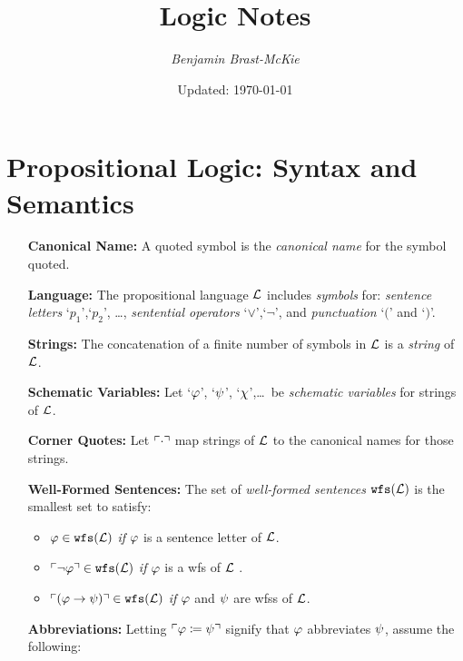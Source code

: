 \documentclass[a4paper, 11pt]{article} %
\title{\textbf{Logic Notes}} %
\author{\em Benjamin Brast-McKie} %
\date{Updated: \today} %
\makeatletter
\renewcommand{\maketitle}{ %
\begin{flushright} %
{\@date\hfill \LARGE\@title} %

\vspace{5pt} %

{\@author} %

\end{flushright}
}
\makeatother
\begin{document}
\maketitle %
\thispagestyle{empty}



\section*{\sc Propositional Logic: Syntax and Semantics}

\begin{enumerate}[leftmargin=1.2in] %
	\item[\bf Canonical Name:] A quoted symbol is the \textit{canonical name} for the symbol quoted.
	\item[\bf Language:] The propositional language $\mathcal{L}$ includes \textit{symbols} for: \textit{sentence letters} `$p_1$',`$p_2$', \dots, \textit{sentential operators} `$\vee$',`$\neg$', and \textit{punctuation} `$($' and `$)$'.
	\item[\bf Strings:] The concatenation of a finite number of symbols in $\mathcal{L}$ is a \textit{string} of $\mathcal{L}$.
	\item[\bf Schematic Variables:] Let `$\varphi$', `$\psi$', `$\chi$',\ldots\ be \textit{schematic variables} for strings of $\mathcal{L}$.
	\item[\bf Corner Quotes:] Let $\ulcorner\cdot\urcorner$ map strings of $\mathcal{L}$ to the canonical names for those strings.
	\item[\bf Well-Formed Sentences:] The set of \textit{well-formed sentences} $\texttt{wfs}(\mathcal{L})$ is the smallest set to satisfy:
	      \begin{itemize}\small
		      \item $\varphi \in \texttt{wfs}(\mathcal{L})$ \textit{if} $\varphi$ is a sentence letter of $\mathcal{L}$.
		      \item $\ulcorner\neg \varphi\urcorner \in \texttt{wfs}(\mathcal{L})$ \textit{if} $\varphi$ is a wfs of $\mathcal{L}$ .
		      \item $\ulcorner(\varphi \rightarrow \psi)\urcorner \in \texttt{wfs}(\mathcal{L})$ \textit{if} $\varphi$ and $\psi$ are wfss of $\mathcal{L}$.
	      \end{itemize}
	\item[\bf Abbreviations:] Letting $\ulcorner\varphi \coloneq \psi\urcorner$ signify that $\varphi$ abbreviates $\psi$, assume the following:

\end{enumerate}
\end{document}
